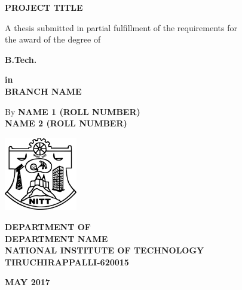 \begin{titlepage}
\begin{center}
\fontsize{18pt}{1cm}\selectfont \textbf{PROJECT TITLE}

\vspace*{1.4cm}
\fontsize{14pt}{21pt}\selectfont A thesis submitted in partial fulfillment of the requirements for\\
the award of the degree of

\vspace*{0.8cm}
\fontsize{14pt}{1cm}\selectfont\textbf{B.Tech.} 

\vspace*{0.8cm}
\textbf{in\\BRANCH NAME}

\vspace*{2.0cm}
By
\textbf{NAME 1 (ROLL NUMBER)\\NAME 2 (ROLL NUMBER)}

\vspace*{2.0cm}
\includegraphics[width=1.25in]{NITT-Logo}

\vspace*{0.3cm}
\fontsize{16pt}{16pt}\selectfont \textbf{DEPARTMENT OF \\DEPARTMENT NAME\\NATIONAL INSTITUTE OF TECHNOLOGY\\TIRUCHIRAPPALLI-620015}

\vspace*{0.5cm}
\textbf{MAY 2017}
\end{center}
\end{titlepage}